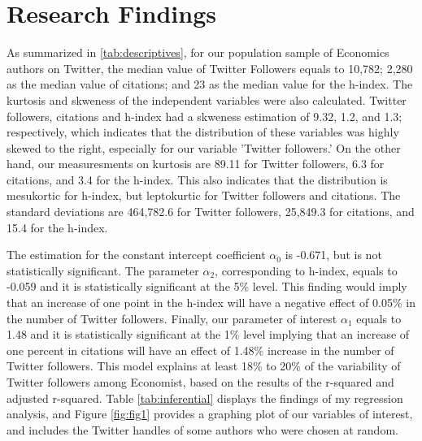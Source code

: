 \documentclass[12pt,english]{article}
\begin{document}
\section{Research Findings}\label{sec:results}
As summarized in \ref{tab:descriptives}, for our population sample of Economics authors on Twitter, the median value of Twitter Followers equals to 10,782; 2,280 as the median value of citations; and 23 as the median value for the h-index. The kurtosis and skweness of the independent variables were also calculated. Twitter followers, citations and h-index had a skweness estimation of 9.32, 1.2, and 1.3; respectively, which indicates that the distribution of these variables was highly skewed to the right, especially for our variable 'Twitter followers.' On the other hand, our measuresments on kurtosis are 89.11 for Twitter followers, 6.3 for citations, and 3.4 for the h-index. This also indicates that the distribution is mesukortic for h-index, but leptokurtic for Twitter followers and citations. The standard deviations are 464,782.6 for Twitter followers, 25,849.3 for citations, and 15.4 for the h-index.

The estimation for the constant intercept coefficient $\alpha_{0}$ is -0.671, but is not statistically significant. The parameter $\alpha_{2}$, corresponding to h-index, equals to -0.059 and it is statistically significant at the 5\% level. This finding would imply that an increase of one point in the h-index will have a negative effect of 0.05\% in the number of Twitter followers. Finally, our parameter of interest $\alpha_{1}$ equals to 1.48 and it is statistically significant at the 1\% level implying that an increase of one percent in citations will have an effect of 1.48\% increase in the number of Twitter followers. This model explains at least 18\% to 20\% of the variability of Twitter followers among Economist, based on the results of the r-squared and adjusted r-squared. Table \ref{tab:inferential} displays the findings of my regression analysis, and Figure \ref{fig:fig1} provides a graphing plot of our variables of interest, and includes the Twitter handles of some authors who were chosen at random. 
\end{document}
